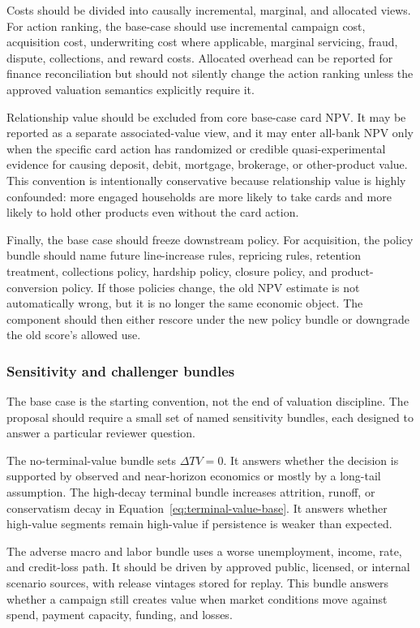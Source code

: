 \documentclass[11pt]{article}
\newcommand{\1}{\mathbf{1}}
\begin{document}
Costs should be divided into causally incremental, marginal, and allocated
views. For action ranking, the base-case should use incremental campaign cost,
acquisition cost, underwriting cost where applicable, marginal servicing,
fraud, dispute, collections, and reward costs. Allocated overhead can be
reported for finance reconciliation but should not silently change the action
ranking unless the approved valuation semantics explicitly require it.

Relationship value should be excluded from core base-case card NPV. It may be
reported as a separate associated-value view, and it may enter all-bank NPV
only when the specific card action has randomized or credible
quasi-experimental evidence for causing deposit, debit, mortgage, brokerage,
or other-product value. This convention is intentionally conservative because
relationship value is highly confounded: more engaged households are more
likely to take cards and more likely to hold other products even without the
card action.

Finally, the base case should freeze downstream policy. For acquisition, the
policy bundle should name future line-increase rules, repricing rules,
retention treatment, collections policy, hardship policy, closure policy, and
product-conversion policy. If those policies change, the old NPV estimate is
not automatically wrong, but it is no longer the same economic object. The
component should then either rescore under the new policy bundle or downgrade
the old score's allowed use.

\subsubsection{Sensitivity and challenger bundles}
\label{subsec:valuation-sensitivities}

The base case is the starting convention, not the end of valuation discipline.
The proposal should require a small set of named sensitivity bundles, each
designed to answer a particular reviewer question.

The no-terminal-value bundle sets $\Delta TV=0$. It answers whether the
decision is supported by observed and near-horizon economics or mostly by a
long-tail assumption. The high-decay terminal bundle increases attrition,
runoff, or conservatism decay in Equation~\eqref{eq:terminal-value-base}. It
answers whether high-value segments remain high-value if persistence is weaker
than expected.

The adverse macro and labor bundle uses a worse unemployment, income, rate,
and credit-loss path. It should be driven by approved public, licensed, or
internal scenario sources, with release vintages stored for replay. This
bundle answers whether a campaign still creates value when market conditions
move against spend, payment capacity, funding, and losses.
\end{document}
